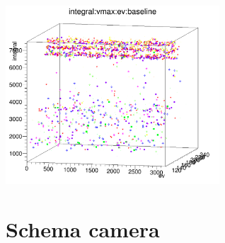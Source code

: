 \documentclass[11pt,a4paper]{article} %
\begin{document}
%

{

\maketitle %

\begin{center}
	\includegraphics[width=0.6\textwidth]{stelle_di_natale_quadrimensionale.png}
\end{center}

\begin{abstract}
	\noindent
	
\end{abstract}

\newpage


\tableofcontents %
{} %


\section{Schema camera}
	

}
\end{document}
